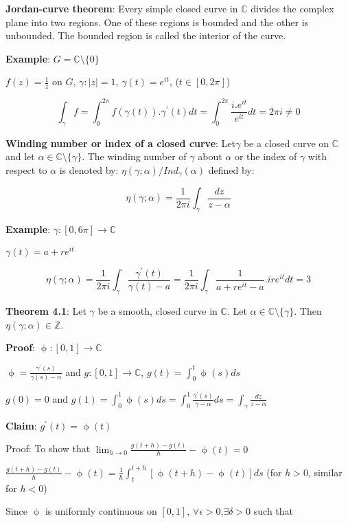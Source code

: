 \documentclass{article}
\begin{document}
\begin{flushleft}
\textbf{Jordan-curve theorem}: Every simple closed curve in $\mathds{C}$ divides the complex plane into two regions. One of these regions is bounded and the other is unbounded. The bounded region is called the interior of the curve.

\textbf{Example}: $G=\mathds{C}\setminus \{0\}$

$f(z)=\frac{1}{z}$ on $G$, $\gamma: |z|=1$, $\gamma(t)=e^{it}$, ($t\in [0,2\pi]$)

$$\int_{\gamma}^{} f= \int_{0}^{2\pi} f(\gamma(t)).\gamma^{'}(t) dt= \int_{0}^{2\pi} \frac{i.e^{it}}{e^{it}} dt =2\pi i\neq 0$$

\textbf{Winding number or index of a closed curve}:
Let$\gamma$ be a closed curve on $\mathds{C}$ and let $\alpha \in \mathds{C}\setminus \{\gamma\}$. The winding number of $\gamma$ about $\alpha$ or the index of $\gamma$ with respect to $\alpha$ is denoted by:
$\eta(\gamma;\alpha)/Ind_{\gamma}(\alpha)$ defined by:

$$\eta(\gamma;\alpha)=\frac{1}{2\pi i}\int_{\gamma}^{}\frac{dz}{z-\alpha}$$

\textbf{Example}: $\gamma: [0,6\pi]\rightarrow \mathds{C}$ 

$\gamma(t)=a+re^{it}$ 

$$\eta(\gamma;\alpha)=\frac{1}{2\pi i}\int_{\gamma}^{} \frac{\gamma^{'}(t)}{\gamma(t)-a}=\frac{1}{2\pi i}\int_{\gamma}^{} \frac{1}{a+re^{it}-a}.ire^{it} dt=3$$

\textbf{Theorem 4.1}: Let $\gamma$ be a smooth, closed curve in $\mathds{C}$. Let $\alpha\in \mathds{C}\setminus \{\gamma\}$. Then $\eta(\gamma;\alpha)\in \mathds{Z}$.

\textbf{Proof}: $\upphi:[0,1] \rightarrow \mathds{C}$

$\upphi= \frac{\gamma^{'}(s)}{\gamma(s)-\alpha}$ and $g:[0,1]\rightarrow \mathds{C}$, $g(t)=\int_{0}^{t} \upphi(s) ds$

$g(0)=0$ and $g(1)=\int_{0}^{1} \upphi(s) ds= \int_{0}^{1} \frac{\gamma^{'}(s)}{\gamma-\alpha} ds= \int_{\gamma}^{} \frac{dz}{z-\alpha}$

\textbf{Claim}: $g^{'}(t)=\upphi(t)$

Proof: To show that $\lim_{h \to 0}\frac{g(t+h)-g(t)}{h}-\upphi(t)=0$

$\frac{g(t+h)-g(t)}{h}-\upphi(t)=\frac{1}{h}\int_{t}^{t+h}[\upphi(t+h)-\upphi(t)] ds$ (for $h>0$, similar for $h<0$)

Since $\upphi$ is uniformly continuous on $[0,1]$, $\forall \epsilon >0$,$\exists \delta>0$ such that 


\end{flushleft}
\end{document}
